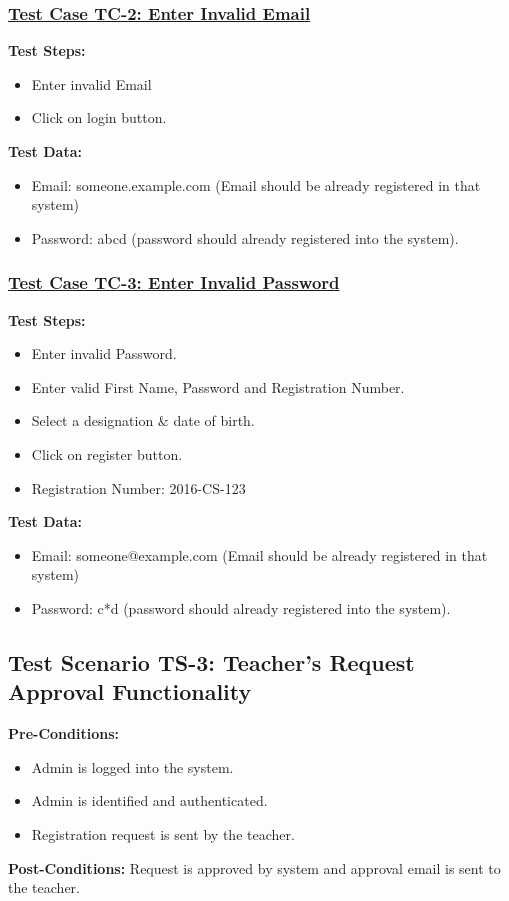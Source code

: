\subsubsection{\underline{Test Case TC-2: Enter Invalid Email}}
\textbf{Test Steps:}
\begin{itemize}

\item Enter invalid Email
\item Click on login button.

\end{itemize}

\textbf{Test Data:}
\begin{itemize}

\item Email: someone.example.com (Email should be already registered in that system)
\item Password: abcd (password should already registered into the system).

\end{itemize}

\subsubsection{\underline{Test Case TC-3: Enter Invalid Password}}
\textbf{Test Steps:}
\begin{itemize}

\item Enter invalid Password.
\item Enter valid First Name, Password and Registration Number.
\item Select a designation \& date of birth.
\item Click on register button.
\item Registration Number: 2016-CS-123

\end{itemize}

\textbf{Test Data:}
\begin{itemize}

\item Email: someone@example.com (Email should be already registered in that system)
\item Password: c*d (password should already registered into the system).

\end{itemize}




\subsection{Test Scenario TS-3: Teacher's Request Approval Functionality}
\textbf{Pre-Conditions: }
\begin{itemize}

\item Admin is logged into the system.
\item Admin is identified and authenticated.
\item Registration request is sent by the teacher.

\end{itemize}
\textbf{Post-Conditions: } Request is approved by system and approval email is sent to the teacher.

